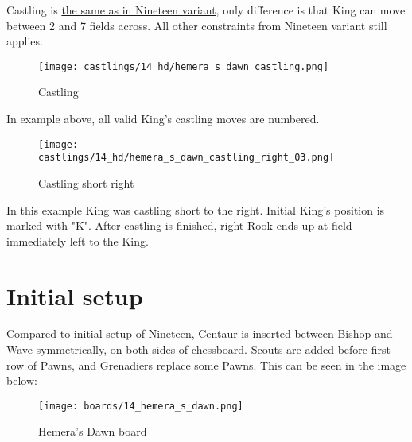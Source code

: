 Castling is
\hyperref[sec:Nineteen/Castling]{the same as in Nineteen variant},
only difference is that King can move
between 2 and 7 fields across. All other constraints from Nineteen variant still
applies.

\noindent
\begin{figure}[!h]
\texttt{[image: castlings/14\_hd/hemera\_s\_dawn\_castling.png]}
\caption{Castling}
\label{fig:hemera_s_dawn_castling}
\end{figure}

In example above, all valid King's castling moves are numbered.

\noindent
\begin{figure}[!h]
\texttt{[image: castlings/14\_hd/hemera\_s\_dawn\_castling\_right\_03.png]}
\caption{Castling short right}
\label{fig:hemera_s_dawn_castling_right_03}
\end{figure}

In this example King was castling short to the right. Initial King's position is
marked with "K". After castling is finished, right Rook ends up at field immediately
left to the King.

\clearpage %

\section*{Initial setup}
\label{sec:Hemera's Dawn/Initial setup}

Compared to initial setup of Nineteen, Centaur is inserted between Bishop and Wave
symmetrically, on both sides of chessboard. Scouts are added before first row of Pawns,
and Grenadiers replace some Pawns. This can be seen in the image below:

\noindent
\begin{figure}[h]
\texttt{[image: boards/14\_hemera\_s\_dawn.png]}
\caption{Hemera's Dawn board}
\label{fig:14_hemera_s_dawn}
\end{figure}

\clearpage %
